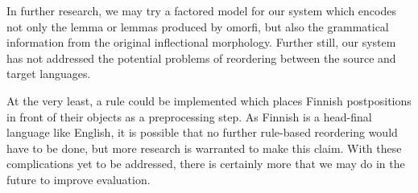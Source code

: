 \documentclass[11pt,a4paper]{article}
\begin{document}
In further research, we may try a factored model for our system which encodes not only the lemma or lemmas produced by omorfi, but also the grammatical information from the original inflectional morphology.
%
Further still, our system has not addressed the potential problems of reordering between the source and target languages.

At the very least, a rule could be implemented which places Finnish postpositions in front of their objects as a preprocessing step.
%
As Finnish is a head-final language like English, it is possible that no further rule-based reordering would have to be done, but more research is warranted to make this claim.
%
With these complications yet to be addressed, there is certainly more that we may do in the future to improve evaluation.





\clearpage


\end{document}
